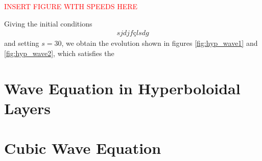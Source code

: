 \textcolor{red}{INSERT FIGURE WITH SPEEDS HERE}

Giving the initial conditions 
%
\begin{align}
    sjdjfçlsdg
\end{align}
%
and setting $s = 30$, we obtain the evolution shown in figures \ref{fig:hyp_wave1} and \ref{fig:hyp_wave2}, which satisfies the 


\section{Wave Equation in Hyperboloidal Layers}
\label{section:hyp_layers_wave}




\section{Cubic Wave Equation}
\label{section:hyp_cubic_wave}



